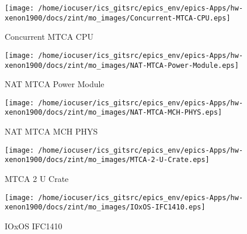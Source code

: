 \noindent
\vspace{1.4cm}
\begin{minipage}{.2\textwidth}
\begin{center}
\texttt{[image: /home/iocuser/ics\_gitsrc/epics\_env/epics-Apps/hw-xenon1900/docs/zint/mo\_images/Concurrent-MTCA-CPU.eps]}
\end{center}
\end{minipage}
\begin{minipage}{.7\textwidth}
Concurrent MTCA CPU
\end{minipage}


\noindent
\vspace{1.4cm}
\begin{minipage}{.2\textwidth}
\begin{center}
\texttt{[image: /home/iocuser/ics\_gitsrc/epics\_env/epics-Apps/hw-xenon1900/docs/zint/mo\_images/NAT-MTCA-Power-Module.eps]}
\end{center}
\end{minipage}
\begin{minipage}{.7\textwidth}
NAT MTCA Power Module
\end{minipage}


\noindent
\vspace{1.4cm}
\begin{minipage}{.2\textwidth}
\begin{center}
\texttt{[image: /home/iocuser/ics\_gitsrc/epics\_env/epics-Apps/hw-xenon1900/docs/zint/mo\_images/NAT-MTCA-MCH-PHYS.eps]}
\end{center}
\end{minipage}
\begin{minipage}{.7\textwidth}
NAT MTCA MCH PHYS
\end{minipage}


\noindent
\vspace{1.4cm}
\begin{minipage}{.2\textwidth}
\begin{center}
\texttt{[image: /home/iocuser/ics\_gitsrc/epics\_env/epics-Apps/hw-xenon1900/docs/zint/mo\_images/MTCA-2-U-Crate.eps]}
\end{center}
\end{minipage}
\begin{minipage}{.7\textwidth}
MTCA 2 U Crate
\end{minipage}


\noindent
\vspace{1.4cm}
\begin{minipage}{.2\textwidth}
\begin{center}
\texttt{[image: /home/iocuser/ics\_gitsrc/epics\_env/epics-Apps/hw-xenon1900/docs/zint/mo\_images/IOxOS-IFC1410.eps]}
\end{center}
\end{minipage}
\begin{minipage}{.7\textwidth}
IOxOS IFC1410
\end{minipage}


